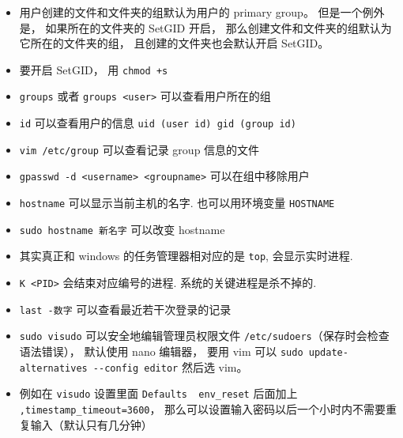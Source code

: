 \begin{itemize}
\item 用户创建的文件和文件夹的组默认为用户的 primary group。 但是一个例外是， 如果所在的文件夹的 SetGID 开启， 那么创建文件和文件夹的组默认为它所在的文件夹的组， 且创建的文件夹也会默认开启 SetGID。
\item 要开启 SetGID， 用 \verb|chmod +s|
\item \verb`groups` 或者 \verb`groups <user>` 可以查看用户所在的组
\item \verb`id` 可以查看用户的信息 \verb`uid (user id) gid (group id)`
\item \verb`vim /etc/group` 可以查看记录 group 信息的文件
\item \verb`gpasswd -d <username> <groupname>` 可以在组中移除用户
\item \verb`hostname` 可以显示当前主机的名字. 也可以用环境变量 \verb|HOSTNAME|
\item \verb|sudo hostname 新名字| 可以改变 hostname
\item 其实真正和 windows 的任务管理器相对应的是 \verb`top`, 会显示实时进程. 
\item \verb`K <PID>` 会结束对应编号的进程. 系统的关键进程是杀不掉的.
\item \verb`last -数字` 可以查看最近若干次登录的记录
\item \verb|sudo visudo| 可以安全地编辑管理员权限文件 \verb|/etc/sudoers|（保存时会检查语法错误）， 默认使用 nano 编辑器， 要用 vim
 可以 \verb|sudo update-alternatives --config editor| 然后选 vim。
\item 例如在 \verb|visudo| 设置里面 \verb|Defaults  env_reset| 后面加上 \verb|,timestamp_timeout=3600|， 那么可以设置输入密码以后一个小时内不需要重复输入（默认只有几分钟）
\end{itemize}

